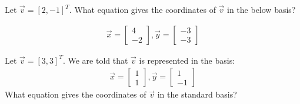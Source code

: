 

\begin{enumerate}

\qitem Let $\vec{v} = [2,-1]^{T}$. What equation gives the coordinates of $\vec{v}$ in the below basis?

\begin{gather*}
\vec{x} = 
\begin{bmatrix}
4 \\
-2
\end{bmatrix},
\vec{y} = \begin{bmatrix}
-3 \\
-3
\end{bmatrix}
\end{gather*}



\qitem Let $\vec{v} = [3,3]^{T}$. We are told that $\vec{v}$ is represented in the basis:
\begin{gather*}
\vec{x} = 
\begin{bmatrix}
1 \\
1
\end{bmatrix},
\vec{y} = \begin{bmatrix}
1 \\
-1
\end{bmatrix}
\end{gather*}
What equation gives the coordinates of $\vec{v}$ in the standard basis?









\end{enumerate}
